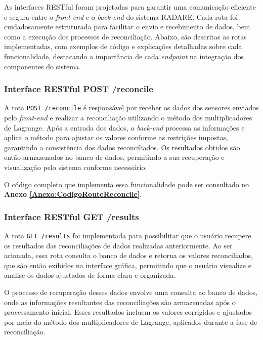 As interfaces RESTful foram projetadas para garantir uma comunicação eficiente e segura entre o \textit{front-end} e o \textit{back-end} do sistema RADARE. Cada rota foi cuidadosamente estruturada para facilitar o envio e recebimento de dados, bem como a execução dos processos de reconciliação. Abaixo, são descritas as rotas implementadas, com exemplos de código e explicações detalhadas sobre cada funcionalidade, destacando a importância de cada \textit{endpoint} na integração dos componentes do sistema.

\subsubsection{Interface RESTful POST /reconcile}

A rota \texttt{POST /reconcile} é responsável por receber os dados dos sensores enviados pelo \textit{front-end} e realizar a reconciliação utilizando o método dos multiplicadores de Lagrange. Após a entrada dos dados, o \textit{back-end} processa as informações e aplica o método para ajustar os valores conforme as restrições impostas, garantindo a consistência dos dados reconciliados. Os resultados obtidos são então armazenados no banco de dados, permitindo a sua recuperação e visualização pelo sistema conforme necessário.

O código completo que implementa essa funcionalidade pode ser consultado no \textbf{Anexo \ref{Anexo:CodigoRouteReconcile}}.

\subsubsection{Interface RESTful GET /results}

A rota \texttt{GET /results} foi implementada para possibilitar que o usuário recupere os resultados das reconciliações de dados realizadas anteriormente. Ao ser acionada, essa rota consulta o banco de dados e retorna os valores reconciliados, que são então exibidos na interface gráfica, permitindo que o usuário visualize e analise os dados ajustados de forma clara e organizada.

O processo de recuperação desses dados envolve uma consulta ao banco de dados, onde as informações resultantes das reconciliações são armazenadas após o processamento inicial. Esses resultados incluem os valores corrigidos e ajustados por meio do método dos multiplicadores de Lagrange, aplicados durante a fase de reconciliação.

